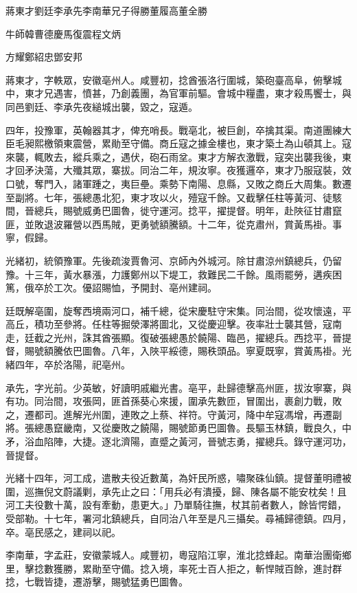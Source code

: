 
\begin{pinyinscope}
蔣東才劉廷李承先李南華兄子得勝董履高董全勝

牛師韓曹德慶馬復震程文炳

方耀鄭紹忠鄧安邦

蔣東才，字軼眾，安徽亳州人。咸豐初，捻酋張洛行圍城，築砲臺高阜，俯擊城中，東才兄遇害，憤甚，乃創義團，為官軍前驅。會城中糧盡，東才殺馬饗士，與同邑劉廷、李承先夜縋城出襲，毀之，寇遁。

四年，投豫軍，英翰器其才，俾充哨長。戰亳北，被巨創，卒擒其渠。南道團練大臣毛昶熙檄領東震營，累勛至守備。商丘寇之據金樓也，東才築土為山頓其上。寇來襲，輒敗去，縱兵乘之，遇伏，砲石雨坌。東才方解衣激戰，寇突出襲我後，東才回矛決蕩，大殲其眾，寨拔。同治二年，規汝寧。夜獲邏卒，東才乃服寇裝，效口號，奪門入，諸軍踵之，夷巨壘。乘勢下南陽、息縣，又敗之商丘大周集。數遷至副將。七年，張總愚北犯，東才攻以火，殪寇千餘。又截擊任柱等黃河、徒駭間，晉總兵，賜號威勇巴圖魯，徙守運河。捻平，擢提督。明年，赴陜征甘肅竄匪，並敗退波羅營以西馬賊，更勇號額騰額。十二年，從克肅州，賞黃馬褂。事寧，假歸。

光緒初，統領豫軍。先後疏浚賈魯河、京師內外城河。除甘肅涼州鎮總兵，仍留豫。十三年，黃水暴漲，力護鄭州以下堤工，救難民二千餘。風雨罷勞，遘疾困篤，俄卒於工次。優詔賜恤，予開封、亳州建祠。

廷既解亳圍，旋奪西境兩河口，補千總，從宋慶駐守宋集。同治間，從攻懷遠，平高丘，積功至參將。任柱等掘滎澤將圖北，又從慶迎擊。夜率壯士襲其營，寇南走，廷截之光州，誅其酋張顯。復破張總愚於饒陽、臨邑，擢總兵。西捻平，晉提督，賜號額騰依巴圖魯。八年，入陜平綏德，賜秩頭品。寧夏既寧，賞黃馬褂。光緒四年，卒於洛陽，祀亳州。

承先，字光前。少英敏，好讀明戚繼光書。亳平，赴歸德擊高州匪，拔汝寧寨，與有功。同治間，攻張岡，匪首孫葵心來援，圍承先數匝，冒圍出，裹創力戰，敗之，遷都司。進解光州圍，連敗之上蔡、祥符。守黃河，降中牟寇馮增，再遷副將。張總愚竄畿南，又從慶敗之饒陽，賜號節勇巴圖魯。長驅玉林鎮，戰良久，中矛，浴血陷陣，大捷。逐北濟陽，直蹙之黃河，晉號志勇，擢總兵。錄守運河功，晉提督。

光緒十四年，河工成，遣散夫役近數萬，為奸民所惑，嘯聚硃仙鎮。提督董明禮被圍，巡撫倪文蔚議剿，承先止之曰：「用兵必有潰擾，歸、陳各屬不能安枕矣！且河工夫役數十萬，設有牽動，患更大。」乃單騎往撫，杖其前者數人，餘皆愕錯，受部勒。十七年，署河北鎮總兵，自同治八年至是凡三攝矣。尋補歸德鎮。四月，卒。亳民感之，建祠以祀。

李南華，字孟莊，安徽蒙城人。咸豐初，粵寇陷江寧，淮北捻蜂起。南華治團衛鄉里，擊捻數獲勝，累勛至守備。捻入境，率死士百人拒之，斬悍賊百餘，進討群捻，七戰皆捷，遷游擊，賜號猛勇巴圖魯。


\end{pinyinscope}
